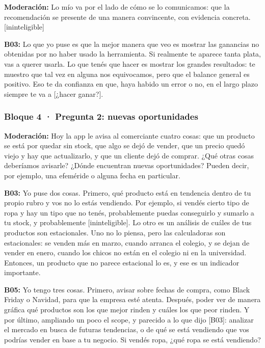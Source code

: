 \noindent\textbf{Moderación:} Lo mío va por el lado de cómo se lo comunicamos: que la recomendación se presente de una manera convincente, con evidencia concreta. [ininteligible]

\noindent\textbf{B03:} Lo que yo puse es que la mejor manera que veo es mostrar las ganancias no obtenidas por no haber usado la herramienta. Si realmente te aparece tanta plata, vas a querer usarla. Lo que tenés que hacer es mostrar los grandes resultados: te muestro que tal vez en alguna nos equivocamos, pero que el balance general es positivo. Eso te da confianza en que, haya habido un error o no, en el largo plazo siempre te va a [¿hacer ganar?].

\subsubsection*{Bloque 4 · Pregunta 2: nuevas oportunidades}

\noindent\textbf{Moderación:} Hoy la app le avisa al comerciante cuatro cosas: que un producto se está por quedar sin stock, que algo se dejó de vender, que un precio quedó viejo y hay que actualizarlo, y que un cliente dejó de comprar. ¿Qué otras cosas deberíamos avisarle? ¿Dónde encuentran nuevas oportunidades? Pueden decir, por ejemplo, una efeméride o alguna fecha en particular.

\noindent\textbf{B03:} Yo puse dos cosas. Primero, qué producto está en tendencia dentro de tu propio rubro y vos no lo estás vendiendo. Por ejemplo, si vendés cierto tipo de ropa y hay un tipo que no tenés, probablemente puedas conseguirlo y sumarlo a tu stock, y probablemente [ininteligible]. Lo otro es un análisis de cuáles de tus productos son estacionales. Uno no lo piensa, pero las calculadoras son estacionales: se venden más en marzo, cuando arranca el colegio, y se dejan de vender en enero, cuando los chicos no están en el colegio ni en la universidad. Entonces, un producto que no parece estacional lo es, y ese es un indicador importante.

\noindent\textbf{B05:} Yo tengo tres cosas. Primero, avisar sobre fechas de compra, como Black Friday o Navidad, para que la empresa esté atenta. Después, poder ver de manera gráfica qué productos son los que mejor rinden y cuáles los que peor rinden. Y por último, ampliando un poco el scope, y parecido a lo que dijo [B03]: analizar el mercado en busca de futuras tendencias, o de qué se está vendiendo que vos podrías vender en base a tu negocio. Si vendés ropa, ¿qué ropa se está vendiendo?

